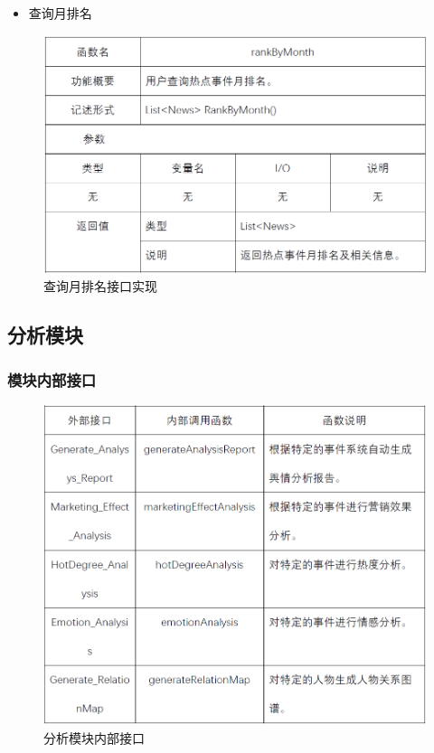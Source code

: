 \begin{itemize}
	\item 查询月排名
\end{itemize}
\begin{figure}[!htbp]
	\centering
	\includegraphics[scale=0.75]{image/b20.png} %
	\caption{查询月排名接口实现} %
\end{figure}
\subsection{分析模块}
\subsubsection{模块内部接口}
\begin{figure}[!htbp]
	\centering
	\includegraphics[scale=0.75]{image/b21.png} %
	\caption{分析模块内部接口} %
\end{figure}
